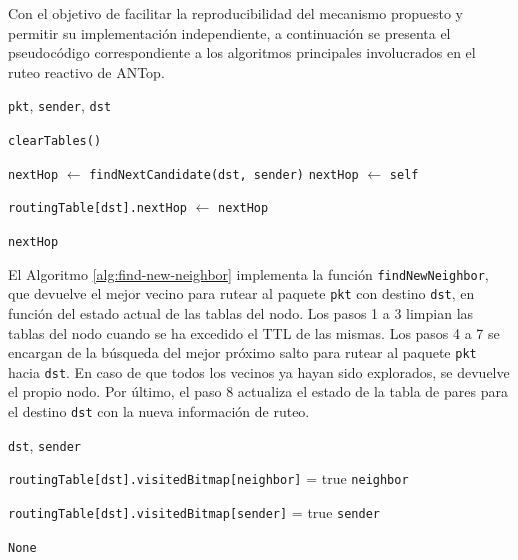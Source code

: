 Con el objetivo de facilitar la reproducibilidad del mecanismo propuesto y permitir su implementación independiente, a continuación se presenta el pseudocódigo correspondiente a los algoritmos principales involucrados en el ruteo reactivo de ANTop.

\begin{algorithm}
\caption{\texttt{findNewNeighbor}}
\label{alg:find-new-neighbor}
\begin{algorithmic}[1]
\Require \texttt{pkt}, \texttt{sender}, \texttt{dst}

    \State \texttt{clearTables()}
\EndIf

\State \texttt{nextHop} $\gets$ \texttt{findNextCandidate(dst, sender)}
    \State \texttt{nextHop} $\gets$ \texttt{self}
\EndIf

\State \texttt{routingTable[dst].nextHop} $\gets$ \texttt{nextHop}

\State \Return \texttt{nextHop}

\end{algorithmic}
\end{algorithm}

El Algoritmo \ref{alg:find-new-neighbor} implementa la función \texttt{findNewNeighbor}, que devuelve el mejor vecino para rutear al paquete \texttt{pkt} con destino \texttt{dst}, en función del estado actual de las tablas del nodo. Los pasos 1 a 3 limpian las tablas del nodo cuando se ha excedido el TTL de las mismas. Los pasos 4 a 7 se encargan de la búsqueda del mejor próximo salto para rutear al paquete \texttt{pkt} hacia \texttt{dst}. En caso de que todos los vecinos ya hayan sido explorados, se devuelve el propio nodo. Por último, el paso 8 actualiza el estado de la tabla de pares para el destino \texttt{dst} con la nueva información de ruteo.

\begin{algorithm}
\caption{\texttt{findNextCandidate}}
\label{alg:find-next-candidate}
\begin{algorithmic}[1]
\Require \texttt{dst}, \texttt{sender}

        \State \texttt{routingTable[dst].visitedBitmap[neighbor]} = true
        \State \Return \texttt{neighbor}
    \EndIf
\EndFor

    \State \texttt{routingTable[dst].visitedBitmap[sender]} = true
    \State \Return \texttt{sender}
\EndIf

\State \Return \texttt{None}

\end{algorithmic}
\end{algorithm}

